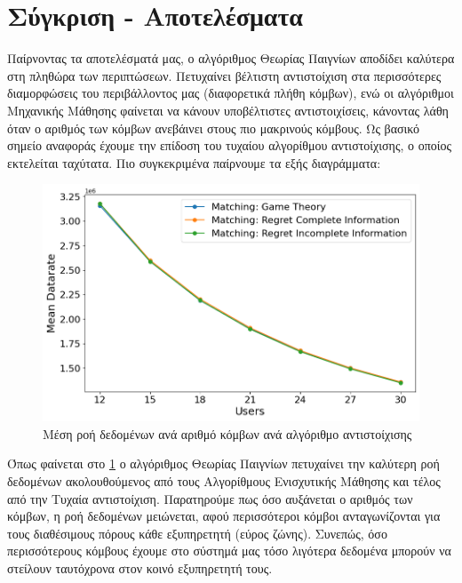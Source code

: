 \section{Σύγκριση - Αποτελέσματα}

Παίρνοντας τα αποτελέσματά μας, ο αλγόριθμος Θεωρίας Παιγνίων αποδίδει καλύτερα στη πληθώρα των περιπτώσεων. Πετυχαίνει βέλτιστη αντιστοίχιση στα περισσότερες διαμορφώσεις του περιβάλλοντος μας (διαφορετικά πλήθη κόμβων), ενώ οι αλγόριθμοι Μηχανικής Μάθησης φαίνεται να κάνουν υποβέλτιστες αντιστοιχίσεις, κάνοντας λάθη όταν ο αριθμός των κόμβων ανεβάινει στους πιο μακρινούς κόμβους. Ως βασικό σημείο αναφοράς έχουμε την επίδοση του τυχαίου αλγορίθμου αντιστοίχισης, ο οποίος εκτελείται ταχύτατα.  Πιο συγκεκριμένα παίρνουμε τα εξής διαγράμματα:

\begin{figure}[H]
    \centering
    \includegraphics[width=\textwidth]{figures/chapter4/Mean_Datarate_vs_Users.png}
    \caption{Μέση ροή δεδομένων ανά αριθμό κόμβων ανά αλγόριθμο αντιστοίχισης}
    \label{fig7}
\end{figure}

Όπως φαίνεται στο \ref{fig7} ο αλγόριθμος Θεωρίας Παιγνίων πετυχαίνει την καλύτερη ροή δεδομένων ακολουθούμενος από τους Αλγορίθμους Ενισχυτικής Μάθησης και τέλος από την Τυχαία αντιστοίχιση. Παρατηρούμε πως όσο αυξάνεται ο αριθμός των κόμβων, η ροή δεδομένων μειώνεται, αφού περισσότεροι κόμβοι ανταγωνίζονται για τους διαθέσιμους πόρους κάθε εξυπηρετητή (εύρος ζώνης). Συνεπώς, όσο περισσότερους κόμβους έχουμε στο σύστημά μας τόσο λιγότερα δεδομένα μπορούν να στείλουν ταυτόχρονα στον κοινό εξυπηρετητή τους.

